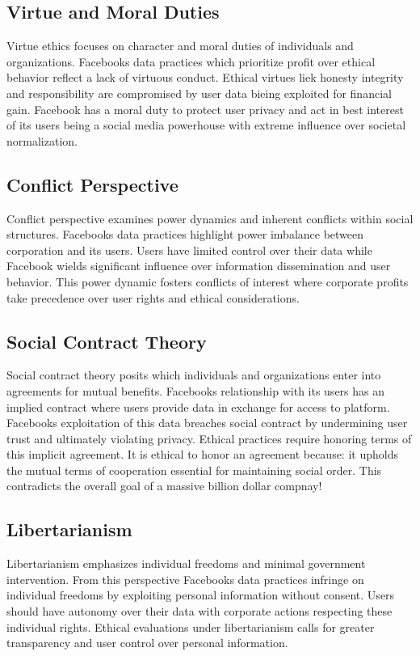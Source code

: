 \documentclass[12pt]{article}
\begin{document}
\subsection{Virtue and Moral Duties}
Virtue ethics focuses on character and moral duties of individuals and organizations. Facebooks data practices which prioritize profit over ethical behavior reflect a lack of virtuous conduct. Ethical virtues liek honesty integrity and responsibility are compromised by user data bieing exploited for financial gain. Facebook has a moral duty to protect user privacy and act in best interest of its users being a social media powerhouse with extreme influence over societal normalization.

\subsection{Conflict Perspective}
Conflict perspective examines power dynamics and inherent conflicts within social structures. Facebooks data practices highlight power imbalance between corporation and its users. Users have limited control over their data while Facebook wields significant influence over information dissemination and user behavior. This power dynamic fosters conflicts of interest where corporate profits take precedence over user rights and ethical considerations.

\subsection{Social Contract Theory}
Social contract theory posits which individuals and organizations enter into agreements for mutual benefits. Facebooks relationship with its users has an implied contract where users provide data in exchange for access to platform.  Facebooks exploitation of this data breaches social contract by undermining user trust and ultimately violating privacy. Ethical practices require honoring terms of this implicit agreement.  It is ethical to honor an agreement because:  it upholds the mutual terms of cooperation essential for maintaining social order.  This contradicts the overall goal of a massive billion dollar compnay!

\subsection{Libertarianism}
Libertarianism emphasizes individual freedoms and minimal government intervention. From this perspective Facebooks data practices infringe on individual freedoms by exploiting personal information without consent. Users should have autonomy over their data with corporate actions respecting these individual rights. Ethical evaluations under libertarianism calls for greater transparency and user control over personal information.
\end{document}
